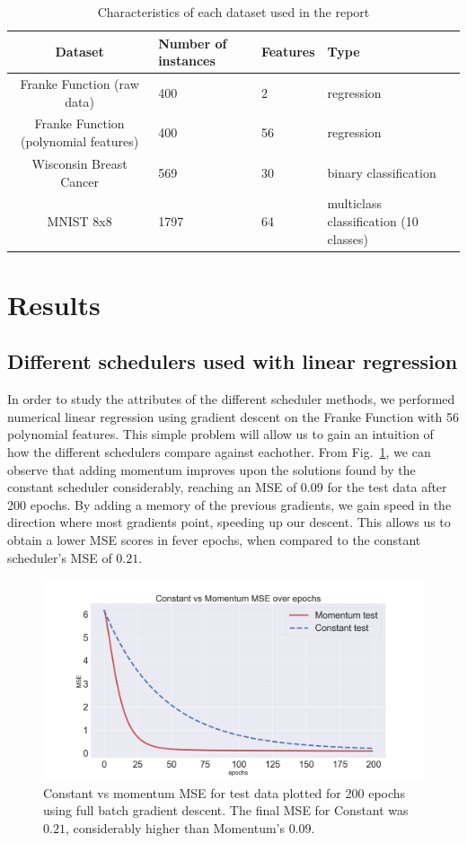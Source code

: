 \documentclass[onecolumn,10pt,cleanfoot]{asme2ej}
\begin{document}
\begin{table}[h]
\caption{Characteristics of each dataset used in the report}
\begin{center}
\label{datasettable}
\begin{tabular}{| c | l | l | l |}
\hline
Dataset & Number of instances & Features & Type \\
\hline
Franke Function (raw data) & 400 & 2 & regression \\
Franke Function (polynomial features) & 400 & 56 & regression \\
Wisconsin Breast Cancer & 569 & 30 & binary classification \\
MNIST 8x8 & 1797 & 64 & multiclass classification (10 classes) \\
\hline
\end{tabular}
\end{center}
\end{table}

\section{Results}

\subsection{Different schedulers used with linear regression}

In order to study the attributes of the different scheduler methods, we performed numerical linear regression using gradient descent on the Franke Function with 56 polynomial features. This simple problem will allow us to gain an intuition of how the different schedulers compare against eachother. From  Fig.~\ref{constant_v_momentum}, we can observe that adding momentum improves upon the solutions found by the constant scheduler considerably, reaching an MSE of $0.09$ for the test data after 200 epochs. By adding a memory of the previous gradients, we gain speed in the direction where most gradients point, speeding up our descent. This allows us to obtain a lower MSE scores in fever epochs, when compared to the constant scheduler's MSE of $0.21$.

\begin{figure}[H]
\centerline{\includegraphics[width=5in]{figure/constant_v_momentum.png}}
\caption{Constant vs momentum MSE for test data plotted for 200 epochs using full batch gradient descent. The final MSE for Constant was $0.21$, considerably higher than Momentum's $0.09$.}
\label{constant_v_momentum}
\end{figure}
\end{document}
